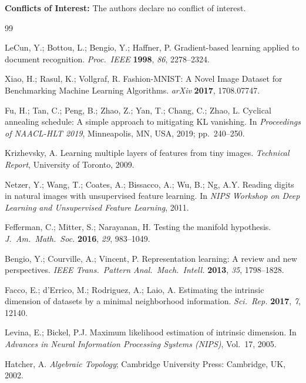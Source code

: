 \documentclass[make,article,submit,pdftex,moreauthors]{Definitions/mdpi}
\begin{document}
\noindent\textbf{Conflicts of Interest:} The authors declare no conflict of interest.

\begin{thebibliography}{99}

LeCun, Y.; Bottou, L.; Bengio, Y.; Haffner, P.
Gradient-based learning applied to document recognition.
\textit{Proc.\ IEEE} \textbf{1998}, \textit{86}, 2278--2324.

Xiao, H.; Rasul, K.; Vollgraf, R.
Fashion-{MNIST}: A Novel Image Dataset for Benchmarking Machine Learning
Algorithms.
\textit{arXiv} \textbf{2017}, 1708.07747.

Fu, H.; Tan, C.; Peng, B.; Zhao, Z.; Yan, T.; Chang, C.; Zhao, L.
Cyclical annealing schedule: A simple approach to mitigating {KL} vanishing.
In \textit{Proceedings of NAACL-HLT 2019}, Minneapolis, MN, USA, 2019; pp.~240--250.

Krizhevsky, A.
Learning multiple layers of features from tiny images.
\textit{Technical Report}, University of Toronto, 2009.

Netzer, Y.; Wang, T.; Coates, A.; Bissacco, A.; Wu, B.; Ng, A.Y.
Reading digits in natural images with unsupervised feature learning.
In \textit{NIPS Workshop on Deep Learning and Unsupervised Feature Learning}, 2011.

Fefferman, C.; Mitter, S.; Narayanan, H.
Testing the manifold hypothesis.
\textit{J.~Am.~Math.~Soc.} \textbf{2016}, \textit{29}, 983--1049.

Bengio, Y.; Courville, A.; Vincent, P.
Representation learning: A review and new perspectives.
\textit{IEEE Trans.~Pattern Anal.~Mach.~Intell.} \textbf{2013}, \textit{35}, 1798--1828.

Facco, E.; d'Errico, M.; Rodriguez, A.; Laio, A.
Estimating the intrinsic dimension of datasets by a minimal neighborhood information.
\textit{Sci.~Rep.} \textbf{2017}, \textit{7}, 12140.

Levina, E.; Bickel, P.J.
Maximum likelihood estimation of intrinsic dimension.
In \textit{Advances in Neural Information Processing Systems (NIPS)}, Vol.~17, 2005.

Hatcher, A. \textit{Algebraic Topology};
Cambridge University Press: Cambridge, UK, 2002.


\end{thebibliography}
\end{document}
